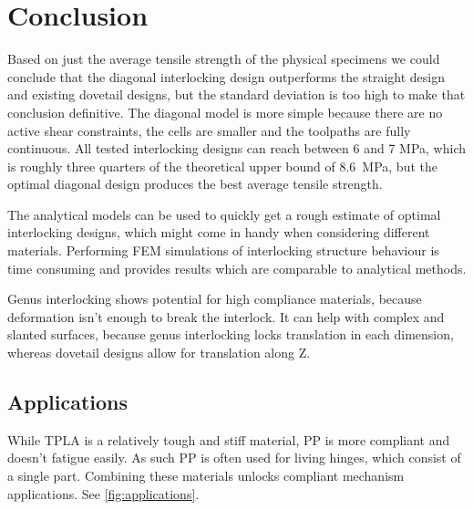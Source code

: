 \section{Conclusion}
Based on just the average tensile strength of the physical specimens we could conclude that the diagonal interlocking design outperforms the straight design and existing dovetail designs,
but the standard deviation is too high to make that conclusion definitive.
The diagonal model is more simple because there are no active shear constraints, the cells are smaller and the toolpaths are fully continuous.
All tested interlocking designs can reach between 6 and 7 \si{\mega\pascal}, which is roughly three quarters of the theoretical upper bound of \SI{8.6}{\mega\pascal},
but the optimal diagonal design produces the best average tensile strength.

The analytical models can be used to quickly get a rough estimate of optimal interlocking designs,
which might come in handy when considering different materials.
Performing FEM simulations of interlocking structure behaviour is time consuming and provides results which are comparable to analytical methods.

Genus interlocking shows potential for high compliance materials, because deformation isn't enough to break the interlock.
It can help with complex and slanted surfaces, because genus interlocking locks translation in each dimension, 
whereas dovetail designs allow for translation along Z.



\subsection{Applications}
While TPLA is a relatively tough and stiff material, PP is more compliant and doesn't fatigue easily.
As such PP is often used for living hinges, which consist of a single part.
Combining these materials unlocks compliant mechanism applications.
See \cref{fig:applications}.


